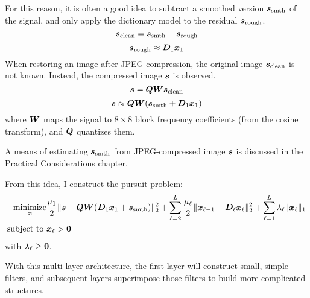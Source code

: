 For this reason, it is often a good idea to subtract a smoothed version $\bm{s}_{\text{smth}}$ of the signal, and only apply the dictionary model to the residual $\bm{s}_{\text{rough}}$.
%
\begin{equation}
\bm{s}_{\text{clean}} = \bm{s}_{\text{smth}} + \bm{s}_{\text{rough}}
\end{equation}
%
\begin{equation}
\bm{s}_{\text{rough}} \approx \bm{D}_1\bm{x}_1
\end{equation}
%
When restoring an image after JPEG compression, the original image $\bm{s}_{\text{clean}}$ is not known. Instead, the compressed image $\bm{s}$ is observed.
%
\begin{equation}
\bm{s} = \bm{Q}\bm{W}\bm{s}_{\text{clean}}
\end{equation}
%
\begin{equation}
\bm{s} \approx \bm{Q}\bm{W}(\bm{s}_{\text{smth}} + \bm{D}_1\bm{x}_1)
\end{equation}
%
where $\bm{W}$ maps the signal to $8 \times 8$ block frequency coefficients (from the cosine transform), and $\bm{Q}$ quantizes them.

A means of estimating $\bm{s}_{\text{smth}}$ from JPEG-compressed image $\bm{s}$ is discussed in the Practical Considerations chapter.

From this idea, I construct the pursuit problem:
\begin{equation}
\begin{aligned}
\operatorname*{\text{minimize}}_{\bm{x}} & \frac{\mu_1}{2}\|\bm{s} - \bm{Q}\bm{W}(\bm{D}_1\bm{x}_1 + \bm{s}_{\text{smth}})\|_2^2 + \sum_{\ell = 2}^L \frac{\mu_{\ell}}{2}\|\bm{x}_{\ell - 1} - \bm{D}_{\ell}\bm{x}_{\ell}\|_2^2 + \sum_{\ell = 1}^L \lambda_{\ell}\|\bm{x}_{\ell}\|_1 \\
\text{subject to } & \bm{x}_{\ell} > \bm{0}
\end{aligned}
\end{equation}
%
with $\lambda_{\ell} \geq \bm{0}$.

With this multi-layer architecture, the first layer will construct small, simple filters, and subsequent layers superimpose those filters to build more complicated structures.

